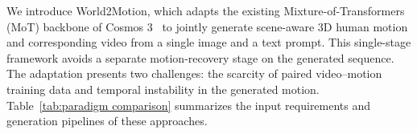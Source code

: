 We introduce World2Motion, which adapts the existing Mixture-of-Transformers (MoT) backbone of Cosmos 3~\citep{agarwal2026cosmos} to jointly generate scene-aware 3D human motion and corresponding video from a single image and a text prompt. This single-stage framework avoids a separate motion-recovery stage on the generated sequence. The adaptation presents two challenges: the scarcity of paired video--motion training data and temporal instability in the generated motion. Table~\ref{tab:paradigm comparison} summarizes the input requirements and generation pipelines of these approaches.

